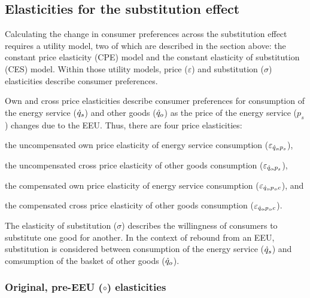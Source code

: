 \documentclass[12pt]{article}\usepackage[]{graphicx}\usepackage[]{xcolor}
\begin{document}
\subsection{Elasticities for the substitution effect}
\label{sec:elasticities_for_sub_effect}

Calculating the change in consumer preferences
across the substitution effect requires a utility model, 
two of which are described in the section above: 
the constant price elasticity (CPE) model and 
the constant elasticity of substitution (CES) model.
Within those utility models, 
price ($\varepsilon$) and substitution ($\sigma$) elasticities
describe consumer preferences.

Own and cross price elasticities 
describe consumer preferences for consumption of the
energy service ($\dot{q}_s$)
and other goods ($\dot{q}_o$)
as the price of the energy service ($p_s$) changes
due to the EEU.
Thus, there are four price elasticities:
%
\begin{enumerate*}[label={(\roman*)}]
	
  \item the uncompensated own price elasticity of energy service consumption ($\varepsilon_{\dot{q}_s\!,p_s}$),
  
  \item the uncompensated cross price elasticity of other goods consumption ($\varepsilon_{\dot{q}_o\!,p_s}$),
    
  \item the compensated own price elasticity of energy service consumption ($\varepsilon_{\dot{q}_s\!,p_s\!,c}$), and 
  
  \item the compensated cross price elasticity of other goods consumption ($\varepsilon_{\dot{q}_o\!,p_s\!,c}$).

\end{enumerate*}

The elasticity of substitution ($\sigma$) 
describes the willingness of consumers
to substitute one good for another.
In the context of rebound from an EEU,
substitution is considered between
consumption of the energy service ($\dot{q}_s$) and
comsumption of the basket of other goods ($\dot{q}_o$).


\subsubsection{Original, pre-EEU ($\circ$) elasticities} 
\label{sec:pre_eeu_elasticities}
\end{document}
